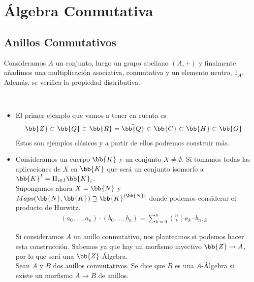 \chapter{Álgebra Conmutativa}

\section{Anillos Conmutativos}

Consideramos $A$ un conjunto, luego un grupo abeliano $(A,+)$ y finalmente añadimos una multiplicación 
asociativa, conmutativa y un elemento neutro, $1_A$. Además, se verifica la propiedad distributiva.

\begin{ejemplo}\
    \begin{itemize}
        \item El primer ejemplo que vamos a tener en cuenta es
        \begin{gather*}
            \bb{Z}\subset \bb{Q} \subset \bb{R} = \bar{\bb{Q}} \subset \bb{C} \subset \bb{H} \subset \bb{O}
        \end{gather*}
        Estos son ejemplos clásicos y a partir de ellos podremos construir más.

        \item Consideramos un cuerpo $\bb{K}$ y un conjunto $X\neq \emptyset$. Si tomamos todas las aplicaciones de $X$ en $\bb{K}$ que será un conjunto isomorfo a $\bb{K}^I = \Pi_{i\in I} \bb{K}_i$.\\
        
        Supongamos ahora $X=\bb{N}$ y $Maps(\bb{N}, \bb{K}) \supseteq \bb{K}^{(\bb{N})}$ donde podemos considerar el producto de Hurwitz.
        \begin{gather*}
            (a_0, ..., a_n) \cdot (b_0, ..., b_n) = \sum_{k=0}^{n} \binom{n}{k} a_k \cdot b_{n\cdot k}
        \end{gather*}


        Si consideramos $A$ un anillo conmutativo, nos planteamos si podemos hacer esta construcción. Sabemos ya que hay un morfismo inyectivo $\bb{Z} \to A$, por lo que será una $\bb{Z}$-Álgebra.\\

        Sean $A$ y $B$ dos anillos conmutativos. Se dice que $B$ es una $A$-Álgebra si existe un morfismo $A\to B$ de anillos.\\


\end{itemize}
\end{ejemplo}
